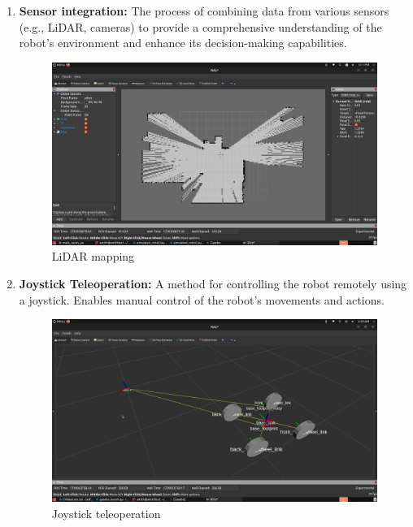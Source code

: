 {\begin{enumerate}[label=\textbf{\arabic*}., leftmargin=*]
		
		\item \textbf{Sensor integration:} The process of combining data from various sensors (e.g., LiDAR,
		cameras) to provide a comprehensive understanding of the robot's environment and
		enhance its decision-making capabilities.
		
		\begin{figure}[H]
			\centering
			\includegraphics[scale=0.21]{images/Content/lidar_mapping}
			\caption{LiDAR mapping}
			\label{fig:lidarmapping}
		\end{figure}
		
		
		\item \textbf{Joystick Teleoperation:} A method for controlling the robot remotely using a joystick.
		Enables manual control of the robot's movements and actions.
		
		\begin{figure}[H]
			\centering
			\includegraphics[scale=0.21]{images/Content/joystick_movement}
			\caption{Joystick teleoperation}
			\label{fig:joystickmovement}
		\end{figure}
		

\end{enumerate}}
